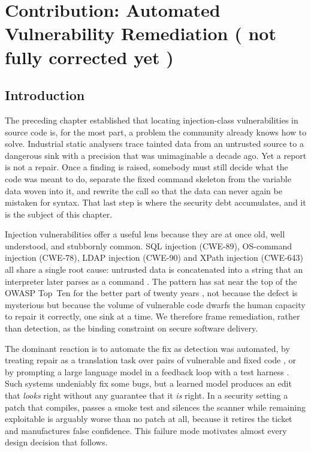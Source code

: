\chapter{Contribution: Automated Vulnerability Remediation ( not fully corrected yet )}
\label{ch:remediation}
\section{Introduction}
\label{rem:intro}

The preceding chapter established that locating injection-class
vulnerabilities in source code is, for the most part, a problem the
community already knows how to solve. Industrial static analysers trace
tainted data from an untrusted source to a dangerous sink with a precision
that was unimaginable a decade ago. Yet a report is not a repair. Once a
finding is raised, somebody must still decide what the code was meant to do,
separate the fixed command skeleton from the variable data woven into it, and
rewrite the call so that the data can never again be mistaken for syntax.
That last step is where the security debt accumulates, and it is the subject
of this chapter.

Injection vulnerabilities offer a useful lens because they are at once old,
well understood, and stubbornly common. SQL injection (CWE-89), OS-command
injection (CWE-78), LDAP injection (CWE-90) and XPath injection (CWE-643)
all share a single root cause: untrusted data is concatenated into a string
that an interpreter later parses as a command
\citep{su2006essence,halfond2006classification}. The pattern has sat near
the top of the OWASP Top~Ten for the better part of twenty years
\citep{owasptop10}, not because the defect is mysterious but because the
volume of vulnerable code dwarfs the human capacity to repair it correctly,
one sink at a time. We therefore frame remediation, rather than detection,
as the binding constraint on secure software delivery.

The dominant reaction is to automate the fix as detection was automated, by
treating repair as a translation task over pairs of vulnerable and fixed
code \citep{fu2022vulrepair,chi2023seqtrans}, or by prompting a large
language model in a feedback loop with a test harness
\citep{xia2023chatrepair,jin2023inferfix,placeholder-llm-repair}. Such
systems undeniably fix some bugs, but a learned model produces an edit that
\emph{looks} right without any guarantee that it \emph{is} right. In a
security setting a patch that compiles, passes a smoke test and silences the
scanner while remaining exploitable is arguably worse than no patch at all,
because it retires the ticket and manufactures false confidence. This
failure mode motivates almost every design decision that follows.


